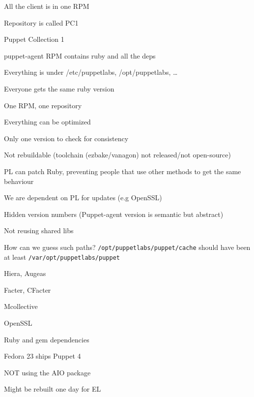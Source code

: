 \begin{iframe}
\item All the client is in one RPM
\item Repository is called PC1
\item Puppet Collection 1
\item puppet-agent RPM contains ruby and all the deps
\item Everything is under /etc/puppetlabs, /opt/puppetlabs, \dots
\end{iframe}
\begin{iframe}
\item Everyone gets the same ruby version
\item One RPM, one repository
\item Everything can be optimized
\item Only one version to check for consistency
\end{iframe}
\begin{iframe}
\item Not rebuildable (toolchain (ezbake/vanagon) not released/not open-source)
\item PL can patch Ruby, preventing people that use other methods to get the same behaviour
\item We are dependent on PL for updates (e.g OpenSSL)
\item Hidden version numbers (Puppet-agent version is semantic but abstract)
\item Not reusing shared libs
\end{iframe}
\begin{iframe}
\item How can we guess such paths? \texttt{/opt/puppetlabs/puppet/cache} should have been at least \texttt{/var/opt/puppetlabs/puppet}
\end{iframe}
\begin{iframe}
\item Hiera, Augeas
\item Facter, CFacter
\item Mcollective
\item OpenSSL
\item Ruby and gem dependencies
\end{iframe}
\begin{iframe}
\item Fedora 23 ships Puppet 4
\item NOT using the AIO package
\item Might be rebuilt one day for EL
\end{iframe}


